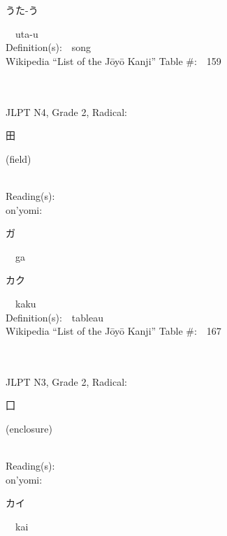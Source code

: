 \begin{multicols}{2}
{\hspace*{2em}}{\begin{CJK}{UTF8}{min} うた-う \end{CJK}}\ \ uta-u\ \ \\
Definition(s):\ \ song \\
Wikipedia ``List of the J\=oy\=o Kanji'' Table \#:\ \ 159 \\
\ \ \\
{\fontsize{34pt}{40pt}  }\ \ \\  %
{JLPT N4, Grade 2, Radical:\ \ {\begin{CJK}{UTF8}{min} 田 \end{CJK}} (field) } \\
Reading(s):\ \ \\
{\hspace*{1em}}on'yomi:\ \ \\
{\hspace*{2em}}{\begin{CJK}{UTF8}{min} ガ \end{CJK}}\ \ ga\ \ \\
{\hspace*{2em}}{\begin{CJK}{UTF8}{min} カク \end{CJK}}\ \ kaku\ \ \\
Definition(s):\ \ tableau \\
Wikipedia ``List of the J\=oy\=o Kanji'' Table \#:\ \ 167 \\
\ \ \\
{\fontsize{34pt}{40pt}  }\ \ \\  %
{JLPT N3, Grade 2, Radical:\ \ {\begin{CJK}{UTF8}{min} 囗 \end{CJK}} (enclosure) } \\
Reading(s):\ \ \\
{\hspace*{1em}}on'yomi:\ \ \\
{\hspace*{2em}}{\begin{CJK}{UTF8}{min} カイ \end{CJK}}\ \ kai\ \ \\

\end{multicols}
